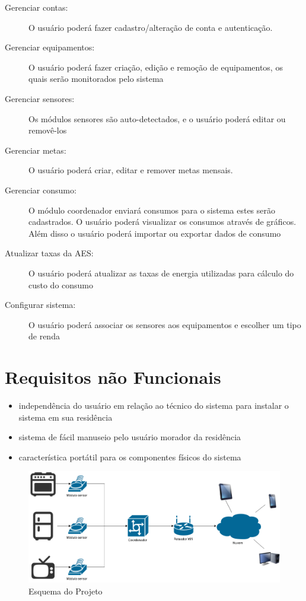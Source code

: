 \begin{description}
	\item[Gerenciar contas:] O usuário poderá fazer cadastro/alteração de conta e autenticação.
	\item[Gerenciar equipamentos:] O usuário poderá fazer criação, edição e remoção de equipamentos, os quais serão monitorados pelo sistema
	\item[Gerenciar sensores:] Os módulos sensores são auto-detectados, e o usuário poderá editar ou removê-los
	\item[Gerenciar metas:] O usuário poderá criar, editar e remover metas mensais.
	\item[Gerenciar consumo:] O módulo coordenador enviará consumos para o sistema estes serão cadastrados. O usuário poderá visualizar os consumos através de gráficos. Além disso o usuário poderá importar ou exportar dados de consumo
	\item[Atualizar taxas da AES:] O usuário poderá atualizar as taxas de energia utilizadas para cálculo do custo do consumo
	\item[Configurar sistema:] O usuário poderá associar os sensores aos equipamentos e escolher um tipo de renda
\end{description}

\section{Requisitos não Funcionais}

\begin{itemize}
	\item{independência do usuário em relação ao técnico do sistema para instalar o sistema em sua residência}
	\item{sistema de fácil manuseio pelo usuário morador da residência}
	\item{característica portátil para os componentes físicos do sistema}
\end{itemize}



\begin{figure}
\centering
\includegraphics[width=1\textwidth]{figuras/esqueminha.png}
\caption{\label{fig:esqueminha} Esquema do Projeto}
\end{figure}

